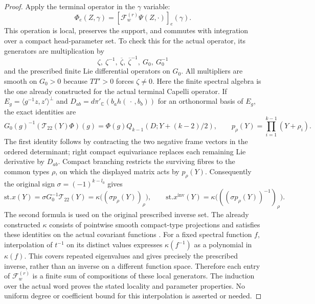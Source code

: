 \begin{proof}
Apply the terminal operator in the $\gamma$ variable:
\[
       \Phi_e(Z,\gamma)
            =[\mathcal F_w^{(r)}\Psi(Z,\cdot)]_e(\gamma).
\]
This operation is local, preserves the support, and commutes
with integration over a compact head-parameter set.  To
check this for the actual operator, its generators are
multiplication by
\[
 \zeta,\ \zeta^{-1},\ \overline\zeta,
 \ \overline\zeta^{-1},\ G_0,\ G_0^{-1}
\]
and the prescribed finite Lie differential operators on
$G_0$.  All multipliers are smooth on $G_0>0$ because
$TT'>0$ forces $\zeta\ne0$.  Here the finite spectral
algebra is the one already constructed for the actual
terminal Capelli operator.  If $E_g=\langle g^{-1}z,z'\rangle^\perp$
and $D_{ab}=d\pi'_{\mathbb C}(b_a h(\,\cdot\,,b_b))$ for
an orthonormal basis of $E_g$, the exact identities are
\[
 G_0(g)^{-1}(\mathcal T_{22}(Y)\Phi)(g)
       =\Phi(g)Q_{k-1}(D;Y+(k-2)/2),\qquad
 p_\rho(Y)=\prod_{i=1}^{k-1}(Y+\rho_i).
\]
The first identity follows by contracting the two negative
frame vectors in the ordered determinant; right compact
equivariance replaces each remaining Lie derivative by
$D_{ab}$.  Compact branching restricts the surviving fibres
to the common types $\rho$, on which the displayed matrix
acts by $p_\rho(Y)$.  Consequently the original sign
$\sigma=(-1)^{k-l_0}$ gives
\[
 \mathrm{st}.x(Y)=\sigma G_0^{-1}\mathcal T_{22}(Y)
      =\kappa\bigl((\sigma p_\rho(Y))_\rho\bigr),\qquad
 \mathrm{st}.x^{\mathrm{inv}}(Y)
      =\kappa\bigl(((\sigma p_\rho(Y))^{-1})_\rho\bigr).
\]
The second formula is used on the original prescribed
inverse set.  The already constructed $\kappa$ consists
of pointwise smooth compact-type projections and satisfies
these identities on the actual covariant functions
\cite{terminal-transfer-actual-spectrum}.
For a fixed spectral function $f$, interpolation of $t^{-1}$
on its distinct values expresses $\kappa(f^{-1})$ as a
polynomial in $\kappa(f)$.  This covers repeated eigenvalues
and gives precisely the prescribed inverse, rather than
an inverse on a different function space.  Therefore
each entry of $\mathcal F_w^{(r)}$ is a finite sum of
compositions of these local generators.  The induction
over the actual word proves the stated locality and
parameter properties.  No uniform degree or coefficient
bound for this interpolation is asserted or needed.


\end{proof}
